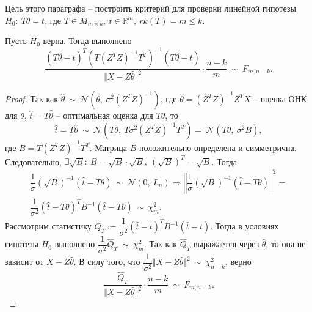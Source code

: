 Цель этого параграфа -- построить критерий для проверки линейной гипотезы $\displaystyle H_{0} :\ T\theta =t$, где $\displaystyle T\in M_{m\times k} ,\ t\in \mathbb{R}^{m} ,\ rk( T) =m\leqslant k$.
\begin{proposition}
    Пусть $\displaystyle H_{0}$ верна. Тогда выполнено
    \begin{equation*}
        \dfrac{( T\hat{\theta } -t)^{T}\left( T\left( Z^{T} Z\right)^{-1} T^{T}\right)^{-1}( T\hat{\theta } -t)}{\Vert X-Z\hat{\theta }\Vert ^{2}} \cdotp \dfrac{n-k}{m} \ \sim \ F_{m,n-k} .
    \end{equation*}
\end{proposition}
\begin{proof}
    Так как $\displaystyle \hat{\theta } \ \sim \ \mathcal{N}\left( \theta ,\ \sigma ^{2}\left( Z^{T} Z\right)^{-1}\right)$, где $\displaystyle \hat{\theta } =\left( Z^{T} Z\right)^{-1} Z^{T} X$ -- оценка ОНК для $\displaystyle \theta $, $\displaystyle \hat{t} =T\hat{\theta }$ -- оптимальная оценка для $\displaystyle T\theta $, то 
    \begin{equation*}
        \hat{t} =T\hat{\theta } \ \sim \ \mathcal{N}\left( T\theta ,\ T\sigma ^{2}\left( Z^{T} Z\right)^{-1} T^{T}\right) =\ \mathcal{N}\left( T\theta ,\ \sigma ^{2} B\right) ,
    \end{equation*}
    где $\displaystyle B=T\left( Z^{T} Z\right)^{-1} T^{T}$. Матрица $\displaystyle B$ положительно определена и симметрична. Следовательно, $\displaystyle \exists \sqrt{B} :\ B=\sqrt{B} \cdotp \sqrt{B} ,\ \left(\sqrt{B}\right)^{T} =\sqrt{B}$. Тогда
    \begin{gather*}
        \dfrac{1}{\sigma }\left(\sqrt{B}\right)^{-1}(\hat{t} -T\theta ) \ \sim \ \mathcal{N}( 0,\ I_{m}) \Rightarrow \left\Vert \dfrac{1}{\sigma }\left(\sqrt{B}\right)^{-1}(\hat{t} -T\theta )\right\Vert ^{2} =\\
        \dfrac{1}{\sigma ^{2}}(\hat{t} -T\theta )^{T} B^{-1}(\hat{t} -T\theta ) \ \sim \ \chi _{m}^{2} .
    \end{gather*}
    Рассмотрим статистику $\displaystyle \hat{Q}_{T} :=\dfrac{1}{\sigma ^{2}}(\hat{t} -t)^{T} B^{-1}(\hat{t} -t)$. Тогда в условиях гипотезы $\displaystyle H_{0}$ выполнено $\displaystyle \dfrac{1}{\sigma ^{2}}\hat{Q}_{T} \ \sim \ \chi _{m}^{2}$. Так как $\displaystyle \hat{Q}_{T}$ выражается через $\displaystyle \hat{\theta }$, то она не зависит от $\displaystyle X-Z\hat{\theta }$. В силу того, что $\displaystyle \dfrac{1}{\sigma ^{2}}\Vert X-Z\hat{\theta }\Vert ^{2} \ \sim \ \chi _{n-k}^{2}$, верно
    \begin{equation*}
        \dfrac{\hat{Q}_{T}}{\Vert X-Z\hat{\theta }\Vert ^{2}} \cdotp \dfrac{n-k}{m} \ \sim \ F_{m,n-k} .
    \end{equation*}
\end{proof}

